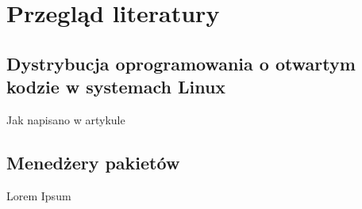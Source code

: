 \section{Przegląd literatury} 

    \subsection{Dystrybucja oprogramowania o otwartym kodzie w systemach Linux}

    Jak napisano w artykule \cite{Package-Management-Systems}

    \subsection{Menedżery pakietów}

    Lorem Ipsum

   
    
    